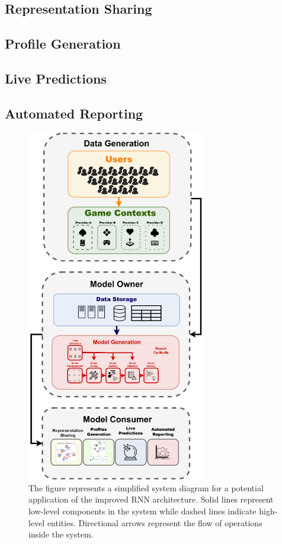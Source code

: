 \subsection{Representation Sharing}
\lorem
\subsection{Profile Generation}
\lorem
\subsection{Live Predictions}
\lorem
\subsection{Automated Reporting}
\lorem

\begin{figure}[ht]
\centering
\includegraphics[width=0.7\textwidth]{images/chapter_5/pipeline_diagram.png}
\caption[\textbf{Model Deployment Pipeline}]{The figure represents a simplified system diagram for a potential application of the improved RNN architecture. Solid lines represent low-level components in the system while dashed lines indicate high-level entities. Directional arrows represent the flow of operations inside the system.}
\label{pipeline}
\end{figure}